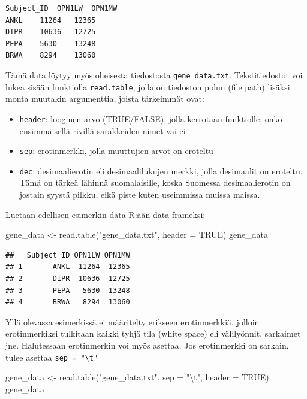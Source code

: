 \documentclass[
]{book}
\newenvironment{Shaded}{\begin{snugshade}}{\end{snugshade}}
\newcommand{\AttributeTok}[1]{\textcolor[rgb]{0.77,0.63,0.00}{#1}}
\newcommand{\ConstantTok}[1]{\textcolor[rgb]{0.00,0.00,0.00}{#1}}
\newcommand{\FunctionTok}[1]{\textcolor[rgb]{0.00,0.00,0.00}{#1}}
\newcommand{\NormalTok}[1]{#1}
\newcommand{\OtherTok}[1]{\textcolor[rgb]{0.56,0.35,0.01}{#1}}
\newcommand{\SpecialCharTok}[1]{\textcolor[rgb]{0.00,0.00,0.00}{#1}}
\newcommand{\StringTok}[1]{\textcolor[rgb]{0.31,0.60,0.02}{#1}}
\providecommand{\tightlist}{%
  \setlength{\itemsep}{0pt}\setlength{\parskip}{0pt}}
\begin{document}
\begin{verbatim}
Subject_ID  OPN1LW  OPN1MW
ANKL    11264   12365
DIPR    10636   12725
PEPA    5630    13248
BRWA    8294    13060
\end{verbatim}

Tämä data löytyy myös oheisesta tiedostosta \texttt{gene\_data.txt}. Tekstitiedostot voi lukea sisään funktiolla \texttt{read.table}, jolla on tiedoston polun (file path) lisäksi monta muutakin argumenttia, joista tärkeimmät ovat:

\begin{itemize}
\tightlist
\item
  \texttt{header}: looginen arvo (TRUE/FALSE), jolla kerrotaan funktiolle, onko ensimmäisellä rivillä sarakkeiden nimet vai ei
\item
  \texttt{sep}: erotinmerkki, jolla muuttujien arvot on eroteltu
\item
  \texttt{dec}: desimaalierotin eli desimaalilukujen merkki, jolla desimaalit on eroteltu. Tämä on tärkeä lähinnä suomalaisille, koska Suomessa desimaalierotin on jostain syystä pilkku, eikä piste kuten useimmissa muissa maissa.
\end{itemize}

Luetaan edellisen esimerkin data R:ään data frameksi:

\begin{Shaded}
\begin{Highlighting}[]
\NormalTok{gene\_data }\OtherTok{\textless{}{-}} \FunctionTok{read.table}\NormalTok{(}\StringTok{"gene\_data.txt"}\NormalTok{, }\AttributeTok{header =} \ConstantTok{TRUE}\NormalTok{)}
\NormalTok{gene\_data}
\end{Highlighting}
\end{Shaded}

\begin{verbatim}
##   Subject_ID OPN1LW OPN1MW
## 1       ANKL  11264  12365
## 2       DIPR  10636  12725
## 3       PEPA   5630  13248
## 4       BRWA   8294  13060
\end{verbatim}

Yllä olevassa esimerkissä ei määritelty erikseen erotinmerkkiä, jolloin erotinmerkiksi tulkitaan kaikki tyhjä tila (white space) eli välilyönnit, sarkaimet jne. Halutessaan erotinmerkin voi myös asettaa. Jos erotinmerkki on sarkain, tulee asettaa \texttt{sep\ =\ "\textbackslash{}t"}

\begin{Shaded}
\begin{Highlighting}[]
\NormalTok{gene\_data }\OtherTok{\textless{}{-}} \FunctionTok{read.table}\NormalTok{(}\StringTok{"gene\_data.txt"}\NormalTok{, }\AttributeTok{sep =} \StringTok{"}\SpecialCharTok{\textbackslash{}t}\StringTok{"}\NormalTok{, }\AttributeTok{header =} \ConstantTok{TRUE}\NormalTok{)}
\NormalTok{gene\_data}
\end{Highlighting}
\end{Shaded}
\end{document}

